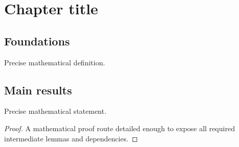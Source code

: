 
\chapter{Chapter title}
\label{chap:chapter_slug}

\section{Foundations}

\begin{definition}
  \label{def:stable_slug}
  \notready
  Precise mathematical definition.
\end{definition}

\section{Main results}

\begin{theorem}
  \label{thm:stable_slug}
  \notready
  Precise mathematical statement.
\end{theorem}

\begin{proof}
  A mathematical proof route detailed enough to expose all required
  intermediate lemmas and dependencies.
\end{proof}
